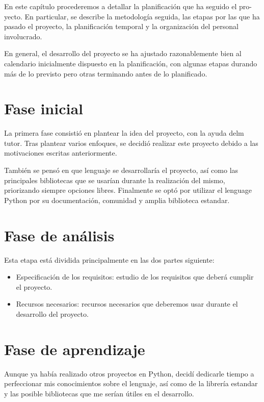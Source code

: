En este capítulo procederemos a detallar la planificación que ha seguido el pro-
yecto. En particular, se describe la metodología seguida, las etapas por las que
ha pasado el proyecto, la planificación temporal y la organización del personal
involucrado.

En general, el desarrollo del proyecto se ha ajustado razonablemente bien al calendario
inicialmente dispuesto en la planificación, con algunas etapas durando
más de lo previsto pero otras terminando antes de lo planificado.

\section{Fase inicial}

La primera fase consistió en plantear la idea del proyecto, con la ayuda delm tutor. Tras plantear
varios enfoques, se decidió realizar este proyecto debido a las motivaciones escritas anteriormente.

También se pensó en que lenguaje se desarrollaría el proyecto, así como las principales bibliotecas que
se usarían durante la realización del mismo, priorizando siempre opciones libres. Finalmente se optó por
utilizar el lenguage Python por su documentación, comunidad y amplia biblioteca estandar.

\section{Fase de análisis}

Esta etapa está dividida principalmente en las dos partes siguiente:

\begin{itemize}
\item Especificación de los requisitos: estudio de los requisitos que deberá cumplir el proyecto.
\item Recursos necesarios: recursos necesarios que deberemos usar durante el desarrollo del proyecto.
\end{itemize}

\section{Fase de aprendizaje}

Aunque ya había realizado otros proyectos en Python, decidí dedicarle tiempo a perfeccionar mis conocimientos
sobre el lenguaje, así como de la librería estandar y las posible bibliotecas que me serían útiles en el desarrollo.

